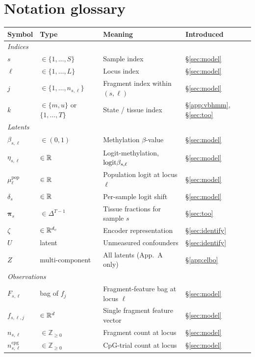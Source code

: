 \section{Notation glossary}
\label{app:gloss}

\begin{center}
\small
\begin{tabular}{llll}
\toprule
Symbol & Type & Meaning & Introduced \\
\midrule
\multicolumn{4}{l}{\emph{Indices}} \\
$s$ & $\in\{1,\dots,S\}$ & Sample index & §\ref{sec:model} \\
$\ell$ & $\in\{1,\dots,L\}$ & Locus index & §\ref{sec:model} \\
$j$ & $\in\{1,\dots,n_{s,\ell}\}$ & Fragment index within $(s,\ell)$ & §\ref{sec:model} \\
$k$ & $\in\{m,u\}$ or $\{1,\dots,T\}$ & State / tissue index & §\ref{app:vbhmm}, §\ref{sec:too} \\
\midrule
\multicolumn{4}{l}{\emph{Latents}} \\
$\beta_{s,\ell}$ & $\in(0,1)$ & Methylation $\beta$-value & §\ref{sec:model} \\
$\eta_{s,\ell}$ & $\in\mathbb{R}$ & Logit-methylation, $\mathrm{logit}\beta_{s,\ell}$ & §\ref{sec:model} \\
$\mu^{\mathrm{pop}}_\ell$ & $\in\mathbb{R}$ & Population logit at locus $\ell$ & §\ref{sec:model} \\
$\delta_s$ & $\in\mathbb{R}$ & Per-sample logit shift & §\ref{sec:model} \\
$\bm\pi_s$ & $\in\Delta^{T-1}$ & Tissue fractions for sample $s$ & §\ref{sec:too} \\
$\zeta$ & $\in\mathbb{R}^{d_c}$ & Encoder representation & §\ref{sec:identify} \\
$U$ & latent & Unmeasured confounders & §\ref{sec:identify} \\
$Z$ & multi-component & All latents (App.~A only) & §\ref{app:elbo} \\
\midrule
\multicolumn{4}{l}{\emph{Observations}} \\
$F_{s,\ell}$ & bag of $f_j$ & Fragment-feature bag at locus $\ell$ & §\ref{sec:model} \\
$f_{s,\ell,j}$ & $\in\mathbb{R}^d$ & Single fragment feature vector & §\ref{sec:model} \\
$n_{s,\ell}$ & $\in\mathbb{Z}_{\ge 0}$ & Fragment count at locus & §\ref{sec:model} \\
$n^{\mathrm{cpg}}_{s,\ell}$ & $\in\mathbb{Z}_{\ge 0}$ & CpG-trial count at locus & §\ref{sec:model} \\

\end{tabular}
\end{center}

